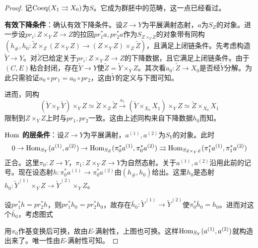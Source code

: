 \begin{proof}
记$\operatorname{Coeq}(X_1\rightrightarrows X_0)$为$S$。它成为群胚中的范畴，这一点已经看过。

\textbf{有效下降条件}：确认有效下降条件。设$Z\to Y$为平展满射态射，$a$为$S_Z$的对象。进一步设$pr_i:Z\times_YZ\to Z$的拉回$pr_1^*a,pr_2^*a$作为$S_{Z\times_YZ}$的对象带有同构$(h_\#,h_0:\tilde Z\times_Z(Z\times_YZ)\to(Z\times_YZ)\times_Z\tilde Z)$，且满足上闭链条件。先考虑构造$\tilde Y\to Y$。对$\tilde Z$已给定关于$pr_i:Z\times_YZ\to Z$的下降数据，且它满足上闭链条件。由于$(C,E)$粘合封闭，存在$\tilde Y\to Y$使$\tilde Z=\tilde Y\times_YZ$。其次看$a_0:\tilde Z\to X_0$是否经$\tilde Y$分解。为此只需验证$a_0\circ pr_1=a_0\circ pr_2$，这由$\tilde Y$的定义与下图可知。
\begin{center}
\end{center}

进而，同构
\[
(\tilde Y\times_Y\tilde Y)\times_YZ\simeq\tilde Z\times_Z\tilde Z\xrightarrow{a_1}(\tilde Y\times_{X_0}X_1)\times_YZ\simeq\tilde Z\times_{X_0}X_1
\]
限制到$Z\times_YZ$上时与$pr_1,pr_2$一致。这由上述同构来自下降数据$h_0$而知。

\textbf{$\operatorname{Hom}$ 的层条件}：设$Z\to Y$为平展满射，$a^{(1)},a^{(2)}$为$S_Y$的对象。此时
\[
0\to\operatorname{Hom}_{S_Y}(a^{(1)},a^{(2)})\to\operatorname{Hom}_{S_Z}(\pi_0^*a^{(1)},\pi_0^*a^{(2)})\rightrightarrows\operatorname{Hom}_{S_{Z\times_YZ}}(\pi_1^*a^{(1)},\pi_1^*a^{(2)})
\]
正合。这里$\pi_0:Z\to Y$，$\pi_1:Z\times_YZ\to Y$为自然态射。关于$a^{(1)},a^{(2)}$沿用此前的记号。现在设态射$h:\pi_0^*a^{(1)}\to\pi_0^*a^{(2)}$由$(h_\#,h_0)$给出。这里$h_0$是态射$h_0:\tilde Y^{(1)}\times_YZ\to\tilde Y^{(2)}\times_YZ$。

设$pr_1^*h=pr_2^*h$，则$pr_1^*h_0=pr_2^*h_0$，故存在$\bar h_0:\tilde Y^{(1)}\to\tilde Y^{(2)}$使$\pi_0^*\bar h_0=h_0$。进而对这个$\bar h_0$，考虑图式
\begin{center}
\end{center}
用$\pi_0$作基变换后可换，故由$E$-满射性，上图也可换。这样$\operatorname{Hom}_{S_Y}(a^{(1)},a^{(2)})$就构造出来了。唯一性由$E$-满射性可知。


\end{proof}
